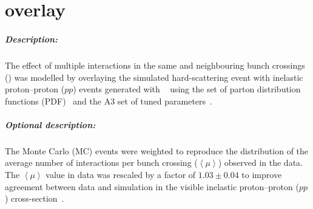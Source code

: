 \chapter{\Pileup overlay}

\paragraph{Description:}

The effect of multiple interactions in the same and neighbouring bunch
crossings (\pileup) was modelled by overlaying the simulated hard-scattering event with 
inelastic proton--proton ($pp$) events generated with \PYTHIA[8.186]~\cite{Sjostrand:2007gs} 
using the \NNPDF[2.3lo] set of parton distribution functions (PDF)~\cite{Ball:2012cx} and the 
A3 set of tuned parameters~\cite{ATL-PHYS-PUB-2016-017}.

\paragraph{Optional description:}

The Monte Carlo (MC) events were weighted to reproduce the
distribution of the average number of interactions per bunch crossing
($\left<\mu \right>$) observed in the data. The $\left<\mu \right>$
value in data was rescaled by a factor of $1.03\pm 0.04$ to improve
agreement between data and simulation in the visible inelastic
proton--proton ($pp$) cross-section~\cite{STDM-2015-05}.

